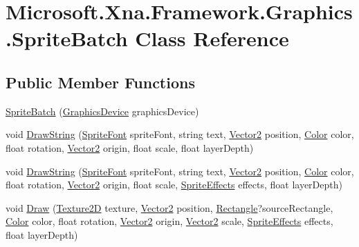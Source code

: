 \hypertarget{class_microsoft_1_1_xna_1_1_framework_1_1_graphics_1_1_sprite_batch}{}\section{Microsoft.\+Xna.\+Framework.\+Graphics.\+Sprite\+Batch Class Reference}
\label{class_microsoft_1_1_xna_1_1_framework_1_1_graphics_1_1_sprite_batch}
\subsection*{Public Member Functions}
\begin{DoxyCompactItemize}
\item 
\hyperlink{class_microsoft_1_1_xna_1_1_framework_1_1_graphics_1_1_sprite_batch_aa123358cb79ed2a8881767c6b2fcc2cc}{Sprite\+Batch} (\hyperlink{class_microsoft_1_1_xna_1_1_framework_1_1_graphics_1_1_graphics_device}{Graphics\+Device} graphics\+Device)
\item 
void \hyperlink{class_microsoft_1_1_xna_1_1_framework_1_1_graphics_1_1_sprite_batch_ac8357b271974cda0e3915c4f9e60479c}{Draw\+String} (\hyperlink{class_microsoft_1_1_xna_1_1_framework_1_1_graphics_1_1_sprite_font}{Sprite\+Font} sprite\+Font, string text, \hyperlink{struct_microsoft_1_1_xna_1_1_framework_1_1_vector2}{Vector2} position, \hyperlink{struct_microsoft_1_1_xna_1_1_framework_1_1_color}{Color} color, float rotation, \hyperlink{struct_microsoft_1_1_xna_1_1_framework_1_1_vector2}{Vector2} origin, float scale, float layer\+Depth)
\item 
void \hyperlink{class_microsoft_1_1_xna_1_1_framework_1_1_graphics_1_1_sprite_batch_afb8516c0f89439591ce6e945ffde0b73}{Draw\+String} (\hyperlink{class_microsoft_1_1_xna_1_1_framework_1_1_graphics_1_1_sprite_font}{Sprite\+Font} sprite\+Font, string text, \hyperlink{struct_microsoft_1_1_xna_1_1_framework_1_1_vector2}{Vector2} position, \hyperlink{struct_microsoft_1_1_xna_1_1_framework_1_1_color}{Color} color, float rotation, \hyperlink{struct_microsoft_1_1_xna_1_1_framework_1_1_vector2}{Vector2} origin, float scale, \hyperlink{namespace_microsoft_1_1_xna_1_1_framework_1_1_graphics_ac5bcbceca6e9af6d220bd386c001d68c}{Sprite\+Effects} effects, float layer\+Depth)
\item 
void \hyperlink{class_microsoft_1_1_xna_1_1_framework_1_1_graphics_1_1_sprite_batch_abdd5abe9f58ad3e596b522705cf39f2f}{Draw} (\hyperlink{class_microsoft_1_1_xna_1_1_framework_1_1_graphics_1_1_texture2_d}{Texture2\+D} texture, \hyperlink{struct_microsoft_1_1_xna_1_1_framework_1_1_vector2}{Vector2} position, \hyperlink{struct_microsoft_1_1_xna_1_1_framework_1_1_rectangle}{Rectangle}?source\+Rectangle, \hyperlink{struct_microsoft_1_1_xna_1_1_framework_1_1_color}{Color} color, float rotation, \hyperlink{struct_microsoft_1_1_xna_1_1_framework_1_1_vector2}{Vector2} origin, \hyperlink{struct_microsoft_1_1_xna_1_1_framework_1_1_vector2}{Vector2} scale, \hyperlink{namespace_microsoft_1_1_xna_1_1_framework_1_1_graphics_ac5bcbceca6e9af6d220bd386c001d68c}{Sprite\+Effects} effects, float layer\+Depth)

\end{DoxyCompactItemize}
